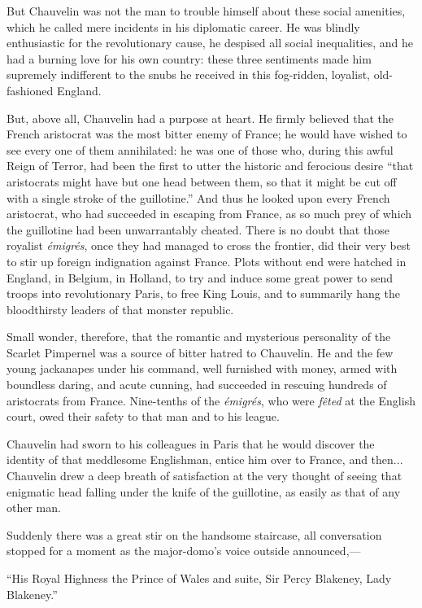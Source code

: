 But Chauvelin was not the man to trouble himself about these social amenities, which he called mere incidents in his diplomatic career. He was blindly enthusiastic for the revolutionary cause, he despised all social inequalities, and he had a burning love for his own country: these three sentiments made him supremely indifferent to the snubs he received in this fog-ridden, loyalist, old-fashioned England.

But, above all, Chauvelin had a purpose at heart. He firmly believed that the French aristocrat was the most bitter enemy of France; he would have wished to see every one of them annihilated: he was one of those who, during this awful Reign of Terror, had been the first to utter the historic and ferocious desire \enquote{that aristocrats might have but one head between them, so that it might be cut off with a single stroke of the guillotine.} And thus he looked upon every French aristocrat, who had succeeded in escaping from France, as so much prey of which the guillotine had been unwarrantably cheated. There is no doubt that those royalist \textit{émigrés}, once they had managed to cross the frontier, did their very best to stir up foreign indignation against France. Plots without end were hatched in England, in Belgium, in Holland, to try and induce some great power to send troops into revolutionary Paris, to free King Louis, and to summarily hang the bloodthirsty leaders of that monster republic.

Small wonder, therefore, that the romantic and mysterious personality of the Scarlet Pimpernel was a source of bitter hatred to Chauvelin. He and the few young jackanapes under his command, well furnished with money, armed with boundless daring, and acute cunning, had succeeded in rescuing hundreds of aristocrats from France. Nine-tenths of the \textit{émigrés}, who were \textit{fêted} at the English court, owed their safety to that man and to his league.

Chauvelin had sworn to his colleagues in Paris that he would discover the identity of that meddlesome Englishman, entice him over to France, and then... Chauvelin drew a deep breath of satisfaction at the very thought of seeing that enigmatic head falling under the knife of the guillotine, as easily as that of any other man.

Suddenly there was a great stir on the handsome staircase, all conversation stopped for a moment as the major-domo's voice outside announced,---

\enquote{His Royal Highness the Prince of Wales and suite, Sir Percy Blakeney, Lady Blakeney.}

